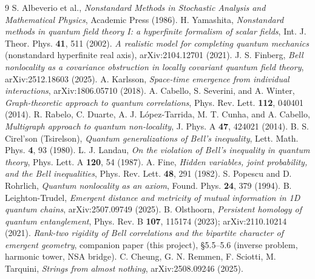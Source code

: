 \documentclass[11pt]{article}
\begin{document}
\begin{thebibliography}{9}
 S. Albeverio et al., \emph{Nonstandard Methods in Stochastic Analysis and Mathematical Physics}, Academic Press (1986).
 H. Yamashita, \emph{Nonstandard methods in quantum field theory I: a hyperfinite formalism of scalar fields}, Int. J. Theor. Phys. \textbf{41}, 511 (2002).
 \emph{A realistic model for completing quantum mechanics} (nonstandard hyperfinite real axis), arXiv:2104.12701 (2021).
 J. S. Finberg, \emph{Bell nonlocality as a covariance obstruction in locally covariant quantum field theory}, arXiv:2512.18603 (2025).
 A. Karlsson, \emph{Space-time emergence from individual interactions}, arXiv:1806.05710 (2018).
 A. Cabello, S. Severini, and A. Winter, \emph{Graph-theoretic approach to quantum correlations}, Phys. Rev. Lett. \textbf{112}, 040401 (2014).
 R. Rabelo, C. Duarte, A. J. L\'opez-Tarrida, M. T. Cunha, and A. Cabello, \emph{Multigraph approach to quantum non-locality}, J. Phys. A \textbf{47}, 424021 (2014).
 B. S. Cirel'son (Tsirelson), \emph{Quantum generalizations of Bell's inequality}, Lett. Math. Phys. \textbf{4}, 93 (1980).
 L. J. Landau, \emph{On the violation of Bell's inequality in quantum theory}, Phys. Lett. A \textbf{120}, 54 (1987).
 A. Fine, \emph{Hidden variables, joint probability, and the Bell inequalities}, Phys. Rev. Lett. \textbf{48}, 291 (1982).
 S. Popescu and D. Rohrlich, \emph{Quantum nonlocality as an axiom}, Found. Phys. \textbf{24}, 379 (1994).
 B. Leighton-Trudel, \emph{Emergent distance and metricity of mutual information in 1D quantum chains}, arXiv:2507.09749 (2025).
 B. Olsthoorn, \emph{Persistent homology of quantum entanglement}, Phys. Rev. B \textbf{107}, 115174 (2023); arXiv:2110.10214 (2021).
 \emph{Rank-two rigidity of Bell correlations and the bipartite character of emergent geometry}, companion paper (this project), \S5.5--5.6 (inverse problem, harmonic tower, NSA bridge).
 C. Cheung, G. N. Remmen, F. Sciotti, M. Tarquini, \emph{Strings from almost nothing}, arXiv:2508.09246 (2025).
\end{thebibliography}
\end{document}
